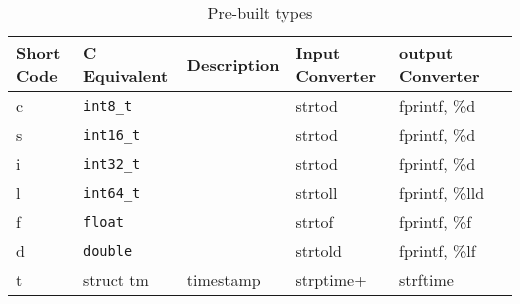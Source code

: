 \documentclass[letterpaper]{article}
\begin{document}
\begin{table}[hb]
\centering
\begin{tabular}{|l|l|l|l|l|l|} \hline \hline
  {\bf Short Code} & {\bf C Equivalent} & {\bf Description} %
  & {\bf Input Converter} & {\bf output Converter} \\ \hline \hline
  c & \verb+int8_t+ &  & strtod & fprintf, \%d\\ \hline
  s & \verb+int16_t+ & & strtod & fprintf, \%d\\ \hline
  i & \verb+int32_t+ & & strtod & fprintf, \%d\\ \hline
  l & \verb+int64_t+ & & strtoll & fprintf, \%lld \\ \hline
  f & \verb+float+ &   & strtof & fprintf, \%f\\ \hline
  d & \verb+double+ &  & strtold & fprintf, \%lf\\ \hline
  t & struct tm & timestamp & strptime+ & strftime \\ \hline
\hline
\end{tabular}
\caption{Pre-built types}
\label{tbl_default_types}
\end{table}
\end{document}
